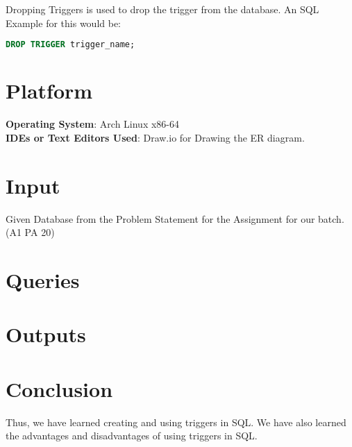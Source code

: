 \documentclass[11pt]{article}
\begin{document}
Dropping Triggers is used to drop the trigger from the database. An SQL Example for this would be: 

\begin{lstlisting}[language=sql]
    DROP TRIGGER trigger_name;
\end{lstlisting}

\section{Platform}
\textbf{Operating System}: Arch Linux x86-64 \\
\textbf{IDEs or Text Editors Used}: Draw.io for Drawing the ER diagram. \\

\section{Input}
Given Database from the Problem Statement for the Assignment for our batch. (A1 PA 20)

\section{Queries}

\section{Outputs}


\section{Conclusion}
Thus, we have learned creating and using triggers in SQL. We have also learned the advantages and disadvantages of using triggers in SQL.
\clearpage
\end{document}
